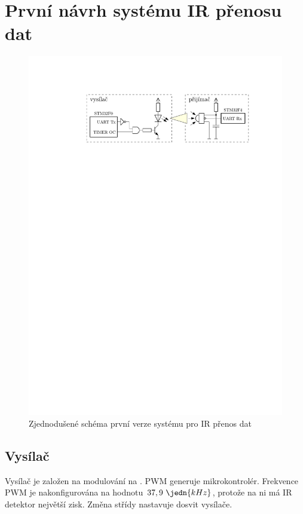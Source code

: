 \section{První návrh systému IR přenosu dat}
\begin{figure}[H]
    \begin{center}
        \includegraphics[width=\textwidth]{img/fake}
    \end{center}
    \caption{Zjednodušené schéma první verze systému pro IR přenos dat}
\end{figure}

\subsection{Vysílač}
Vysílač je založen na modulování  na . PWM generuje mikrokontrolér. Frekvence PWM je nakonfigurována na hodnotu $37,9~\jedn{kHz}$, protože na ni má IR detektor největší zisk. Změna střídy nastavuje dosvit vysílače.

